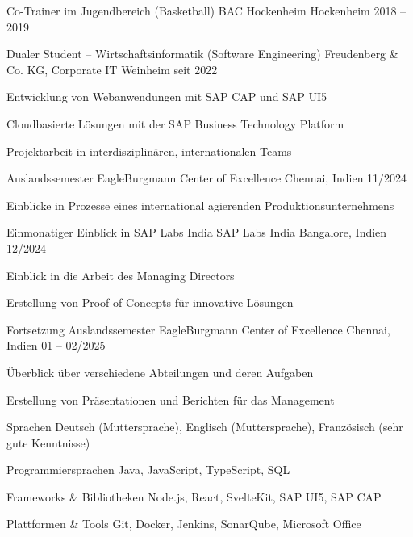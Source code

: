 \documentclass[11pt, a4paper]{awesome-cv}
\begin{document}
\begin{cventries}

\cventry
  {Co-Trainer im Jugendbereich (Basketball)}
  {BAC Hockenheim}
  {Hockenheim}
  {2018 -- 2019}
  {}

\cventry
  {Dualer Student – Wirtschaftsinformatik (Software Engineering)}
  {Freudenberg \& Co. KG, Corporate IT}
  {Weinheim}
  {seit 2022}
  {
    \begin{cvitems}
      \item {Entwicklung von Webanwendungen mit SAP CAP und SAP UI5}
      \item {Cloudbasierte Lösungen mit der SAP Business Technology Platform}
      \item {Projektarbeit in interdisziplinären, internationalen Teams}
    \end{cvitems}
  }

\cventry
  {Auslandssemester}
  {EagleBurgmann Center of Excellence}
  {Chennai, Indien}
  {11/2024}
  {
    \begin{cvitems}
      \item {Einblicke in Prozesse eines international agierenden Produktionsunternehmens}
    \end{cvitems}
  }

\cventry
  {Einmonatiger Einblick in SAP Labs India}
  {SAP Labs India}
  {Bangalore, Indien}
  {12/2024}
  {
    \begin{cvitems}
      \item {Einblick in die Arbeit des Managing Directors}
      \item {Erstellung von Proof-of-Concepts für innovative Lösungen}
    \end{cvitems}
  }

\cventry
  {Fortsetzung Auslandssemester}
  {EagleBurgmann Center of Excellence}
  {Chennai, Indien}
  {01 -- 02/2025}
  {
    \begin{cvitems}
      \item {Überblick über verschiedene Abteilungen und deren Aufgaben}
      \item {Erstellung von Präsentationen und Berichten für das Management}
    \end{cvitems}
  }

\end{cventries}


\begin{cvskills}

\cvskill
{Sprachen}
{Deutsch (Muttersprache), Englisch (Muttersprache), Französisch (sehr gute Kenntnisse)}

\cvskill
{Programmiersprachen}
{Java, JavaScript, TypeScript, SQL}

\cvskill
{Frameworks \& Bibliotheken}
{Node.js, React, SvelteKit, SAP UI5, SAP CAP}

\cvskill
{Plattformen \& Tools}
{Git, Docker, Jenkins, SonarQube, Microsoft Office}

\end{cvskills}
\end{document}
